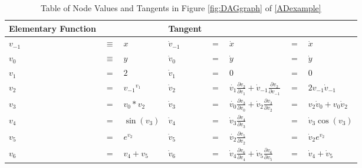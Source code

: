 \documentclass{article}
\begin{document}
\begin{table}[h!]
    \centering
    \begin{tabular}{|lcl|lclll|}
        \hline
        Elementary Function & & & Tangent & & & & \\
        \hline
        $v_{-1}$ & $\equiv$ & $x$ & $\dot{v}_{-1}$ & $=$ & $\dot{x}$ & $=$ & $\dot{x}$\\
        $v_{0}$ & $\equiv$ & $y$ & $\dot{v}_{0}$ & $=$ & $\dot{y}$ & $=$ & $\dot{y}$\\
        \hline
        $v_{1}$ & $=$ & $2$ & $\dot{v}_{1}$ & $=$ & $0$ & $=$ & $0$\\
        $v_{2}$ & $=$ & ${v_{-1}}^{v_{1}}$ & $\dot{v}_{2}$ & $=$ & $\dot{v_1}\frac{\partial{v_2}}{\partial{v_1}} + \dot{v}_{-1}\frac{\partial{v_2}}{\partial{v_{-1}}}$ & $=$ & $2v_{-1}\dot{v}_{-1}$\\
        $v_{3}$ & $=$ & ${v_{0}}*{v_{2}}$ & $\dot{v}_{3}$ & $=$ & $\dot{v_0}\frac{\partial{v_3}}{\partial{v_0}} + \dot{v}_{2}\frac{\partial{v_3}}{\partial{v_{2}}}$ & $=$ & $v_2\dot{v}_{0}+v_{0}\dot{v}_2$\\
        $v_{4}$ & $=$ & $\sin(v_3)$ & $\dot{v}_{4}$ & $=$ & $\dot{v}_3\frac{\partial{v_4}}{\partial{v_3}}$ & $=$ & $\dot{v}_3 \cos (v_3)$\\
        $v_{5}$ & $=$ & $e^{v_2}$ & $\dot{v}_{5}$ & $=$ & $\dot{v_2}\frac{\partial{v_5}}{\partial{v_2}}$ & $=$ & $\dot{v}_2 e^{v_2}$\\
        \hline
        $v_{6}$ & $=$ & $v_4 + v_5$ & $\dot{v}_{6}$ & $=$ & $\dot{v}_4 \frac{\partial v_6}{\partial v_4} + \dot{v}_5 \frac{\partial v_6}{\partial v_5}$ & $=$ & $\dot{v}_4 + \dot{v}_5$\\
        \hline
    \end{tabular}
    \caption{Table of Node Values and Tangents in Figure \ref{fig:DAGgraph} of \eqref{ADexample}}
    \label{tab:fexample1}
\end{table}
\end{document}
